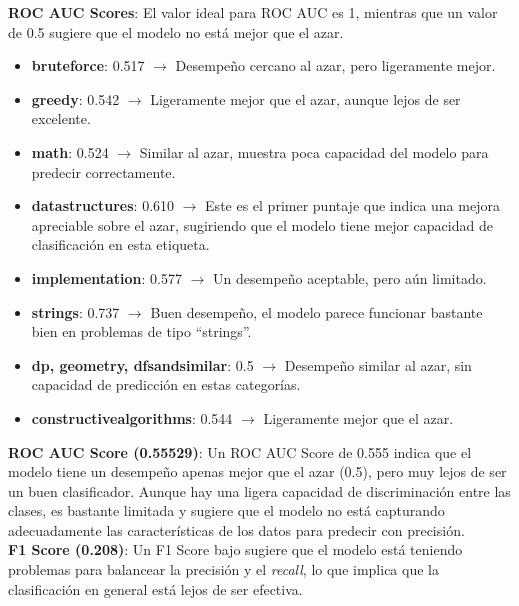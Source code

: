 \documentclass{article}
\begin{document}
\vspace{0.5cm}

\textbf{ROC AUC Scores}: El valor ideal para ROC AUC es 1, mientras que un valor de 0.5 sugiere que el modelo no está mejor que el azar.

\begin{itemize}
    \item \textbf{bruteforce}: 0.517 $\rightarrow$ Desempeño cercano al azar, pero ligeramente mejor.
    \item \textbf{greedy}: 0.542 $\rightarrow$ Ligeramente mejor que el azar, aunque lejos de ser excelente.
    \item \textbf{math}: 0.524 $\rightarrow$ Similar al azar, muestra poca capacidad del modelo para predecir correctamente.
    \item \textbf{datastructures}: 0.610 $\rightarrow$ Este es el primer puntaje que indica una mejora apreciable sobre el azar, sugiriendo que el modelo tiene mejor capacidad de clasificación en esta etiqueta.
    \item \textbf{implementation}: 0.577 $\rightarrow$ Un desempeño aceptable, pero aún limitado.
    \item \textbf{strings}: 0.737 $\rightarrow$ Buen desempeño, el modelo parece funcionar bastante bien en problemas de tipo ``strings''.
    \item \textbf{dp, geometry, dfsandsimilar}: 0.5 $\rightarrow$ Desempeño similar al azar, sin capacidad de predicción en estas categorías.
    \item \textbf{constructivealgorithms}: 0.544 $\rightarrow$ Ligeramente mejor que el azar.
\end{itemize}

\textbf {ROC AUC Score (0.55529)}: Un ROC AUC Score de 0.555 indica que el modelo tiene un desempeño apenas mejor que el azar (0.5), pero muy lejos de ser un buen clasificador. Aunque hay una ligera capacidad de discriminación entre las clases, es bastante limitada y sugiere que el modelo no está capturando adecuadamente las características de los datos para predecir con precisión.\\

\textbf{F1 Score (0.208)}: Un F1 Score bajo sugiere que el modelo está teniendo problemas para balancear la precisión y el \textit{recall}, lo que implica que la clasificación en general está lejos de ser efectiva.
\end{document}
